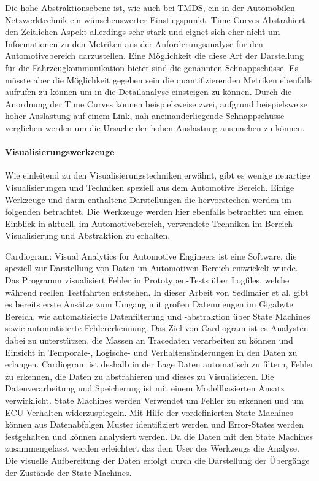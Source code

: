 \documentclass[draft=false
              ,paper=a4
              ,twoside=false
              ,fontsize=11pt
              ,headsepline
              ,BCOR10mm
              ,DIV11
              ]{scrbook}
\begin{document}
Die hohe Abstraktionsebene ist, wie auch bei TMDS, ein in der Automobilen Netzwerktechnik ein wünschenswerter Einstiegspunkt. Time Curves Abstrahiert den Zeitlichen Aspekt allerdings sehr stark und eignet sich eher nicht um Informationen zu den Metriken aus der Anforderungsanalyse für den Automotivebereich darzustellen. Eine Möglichkeit die diese Art der Darstellung für die Fahrzeugkommunikation bietet sind die genannten Schnappschüsse. Es müsste aber die Möglichkeit gegeben sein die quantifizierenden Metriken ebenfalls aufrufen zu können um in die Detailanalyse einsteigen zu können. Durch die Anordnung der Time Curves können beispielsweise zwei, aufgrund beispielsweise hoher Auslastung auf einem Link, nah aneinanderliegende Schnappschüsse verglichen werden um die Ursache der hohen Auslastung ausmachen zu können.  

\paragraph{Visualisierungswerkzeuge} %
\label{par:visualisierungswerkzeuge}
Wie einleitend zu den Visualisierungstechniken erwähnt, gibt es wenige neuartige Visualisierungen und Techniken speziell aus dem Automotive Bereich. Einige Werkzeuge und darin enthaltene Darstellungen die hervorstechen werden im folgenden betrachtet. Die Werkzeuge werden hier ebenfalls betrachtet um einen Einblick in aktuell, im Automotivebereich, verwendete Techniken im Bereich Visualisierung und Abstraktion zu erhalten. 

Cardiogram: Visual Analytics for Automotive Engineers \cite{sedlmair_cardiogram:_2011} ist eine Software, die speziell zur Darstellung von Daten im Automotiven Bereich entwickelt wurde. Das Programm visualisiert Fehler in Prototypen-Tests über Logfiles, welche während reellen Testfahrten entstehen. In dieser Arbeit von Sedlmaier et al. gibt es bereits erste Ansätze zum Umgang mit großen Datenmengen im Gigabyte Bereich, wie automatisierte Datenfilterung und -abstraktion über State Machines sowie automatisierte Fehlererkennung. Das Ziel von Cardiogram ist es Analysten dabei zu unterstützen, die Massen an Tracedaten verarbeiten zu können und Einsicht in Temporale-, Logische- und Verhaltensänderungen in den Daten zu erlangen. Cardiogram ist deshalb in der Lage Daten automatisch zu filtern, Fehler zu erkennen, die Daten zu abstrahieren und dieses zu Visualisieren. Die Datenverarbeitung und Speicherung ist mit einem Modellbasierten Ansatz verwirklicht. State Machines werden Verwendet um Fehler zu erkennen und um ECU Verhalten widerzuspiegeln. Mit Hilfe der vordefinierten State Machines können aus Datenabfolgen Muster identifiziert werden und Error-States werden festgehalten und können analysiert werden. Da die Daten mit den State Machines zusammengefasst werden erleichtert das dem User des Werkzeugs die Analyse. Die visuelle Aufbereitung der Daten erfolgt durch die Darstellung der Übergänge der Zustände der State Machines. 
\end{document}
